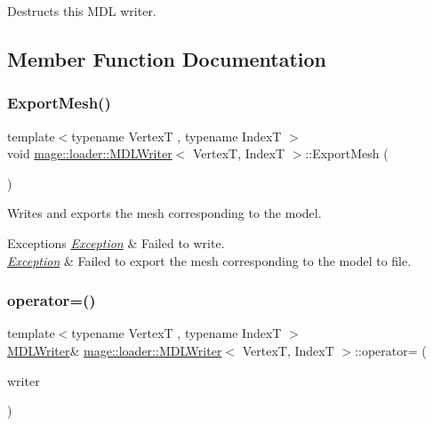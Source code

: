 Destructs this M\+DL writer. 

\subsection{Member Function Documentation}
\hypertarget{classmage_1_1loader_1_1_m_d_l_writer_a1f84a800cc0b415894914b64e3cc82d4}{}\label{classmage_1_1loader_1_1_m_d_l_writer_a1f84a800cc0b415894914b64e3cc82d4} 
\subsubsection{\texorpdfstring{Export\+Mesh()}{ExportMesh()}}
{\footnotesize\ttfamily template$<$typename VertexT , typename IndexT $>$ \\
void \hyperlink{classmage_1_1loader_1_1_m_d_l_writer}{mage\+::loader\+::\+M\+D\+L\+Writer}$<$ VertexT, IndexT $>$\+::Export\+Mesh (\begin{DoxyParamCaption}{ }\end{DoxyParamCaption})\hspace{0.3cm}{\ttfamily [private]}}

Writes and exports the mesh corresponding to the model.


\begin{DoxyExceptions}{Exceptions}
{\em \hyperlink{classmage_1_1_exception}{Exception}} & Failed to write. \\
\hline
{\em \hyperlink{classmage_1_1_exception}{Exception}} & Failed to export the mesh corresponding to the model to file. \\
\hline
\end{DoxyExceptions}
\hypertarget{classmage_1_1loader_1_1_m_d_l_writer_abeb16a16698c5c3dde9da9b39be74269}{}\label{classmage_1_1loader_1_1_m_d_l_writer_abeb16a16698c5c3dde9da9b39be74269} 
\subsubsection{\texorpdfstring{operator=()}{operator=()}\hspace{0.1cm}{\footnotesize\ttfamily [1/2]}}
{\footnotesize\ttfamily template$<$typename VertexT , typename IndexT $>$ \\
\hyperlink{classmage_1_1loader_1_1_m_d_l_writer}{M\+D\+L\+Writer}\& \hyperlink{classmage_1_1loader_1_1_m_d_l_writer}{mage\+::loader\+::\+M\+D\+L\+Writer}$<$ VertexT, IndexT $>$\+::operator= (\begin{DoxyParamCaption}\item[{const \hyperlink{classmage_1_1loader_1_1_m_d_l_writer}{M\+D\+L\+Writer}$<$ VertexT, IndexT $>$ \&}]{writer }\end{DoxyParamCaption})\hspace{0.3cm}{\ttfamily [delete]}}

